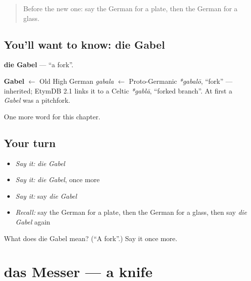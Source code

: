 \label{lesson:GE-C79-gabel}



\begin{quote}
Before the new one: say the German for a plate, then the German for a glass.
\end{quote}

\subsection*{You'll want to know: die Gabel}
\textbf{die Gabel} — \textquotedblleft{}a fork\textquotedblright{}.

\begin{cousinweb}
\textbf{Gabel} $\leftarrow$ Old High German \emph{gabala} $\leftarrow$ Proto-Germanic \emph{*gabalō}, \textquotedblleft{}fork\textquotedblright{} — inherited; EtymDB 2.1 links it to a Celtic \emph{*gablā}, \textquotedblleft{}forked branch\textquotedblright{}. At first a \emph{Gabel} was a pitchfork.
\end{cousinweb}

\begin{grammarlens}[title={What you've built}]
One more word for this chapter.
\end{grammarlens}

\subsection*{Your turn}
\begin{itemize}
\raggedright
  \item \emph{Say it:} \emph{die Gabel}
  \item \emph{Say it:} \emph{die Gabel}, once more
  \item \emph{Say it:} say \emph{die Gabel}
  \item \emph{Recall:} say the German for a plate, then the German for a glass, then say \emph{die Gabel} again
\end{itemize}

\begin{tcolorbox}[breakable,colback=teal!4,colframe=teal!35!black,title={Before you move on}]
What does die Gabel mean? (\textquotedblleft{}A fork\textquotedblright{}.) Say it once more.
\end{tcolorbox}
\section[das Messer]{das Messer — a knife}

